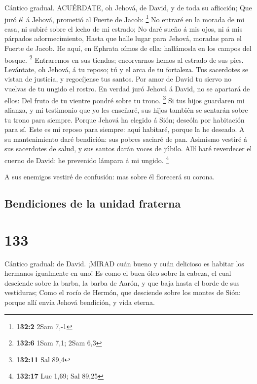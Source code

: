  Cántico gradual. ACUÉRDATE, oh Jehová, de David, y de toda
su aflicción;  Que juró él á Jehová, prometió al Fuerte de
Jacob: \footnote{\textbf{132:2} 2Sam 7,-1}  No entraré en la
morada de mi casa, ni subiré sobre el lecho de mi estrado; 
No daré sueño á mis ojos, ni á mis párpados adormecimiento, 
Hasta que halle lugar para Jehová, moradas para el Fuerte de Jacob.
 He aquí, en Ephrata oímos de ella: hallámosla en los campos
del bosque. \footnote{\textbf{132:6} 1Sam 7,1; 2Sam 6,3} 
Entraremos en sus tiendas; encorvarnos hemos al estrado de sus pies.
 Levántate, oh Jehová, á tu reposo; tú y el arca de tu
fortaleza.  Tus sacerdotes se vistan de justicia, y
regocíjense tus santos.  Por amor de David tu siervo no
vuelvas de tu ungido el rostro.  En verdad juró Jehová á
David, no se apartará de ellos: Del fruto de tu vientre pondré sobre tu
trono. \footnote{\textbf{132:11} Sal 89,4}  Si tus hijos
guardaren mi alianza, y mi testimonio que yo les enseñaré, sus hijos
también se sentarán sobre tu trono para siempre.  Porque
Jehová ha elegido á Sión; deseóla por habitación para sí. 
Este es mi reposo para siempre: aquí habitaré, porque la he deseado.
 A su mantenimiento daré bendición: sus pobres saciaré de
pan.  Asimismo vestiré á sus sacerdotes de salud, y sus
santos darán voces de júbilo.  Allí haré reverdecer el
cuerno de David: he prevenido lámpara á mi ungido. \footnote{\textbf{132:17}
  Luc 1,69; Sal 89,25}

 A sus enemigos vestiré de confusión: mas sobre él
florecerá su corona.

\hypertarget{bendiciones-de-la-unidad-fraterna}{%
\subsection{Bendiciones de la unidad
fraterna}\label{bendiciones-de-la-unidad-fraterna}}

\hypertarget{section-132}{%
\section{133}\label{section-132}}

 Cántico gradual: de David. ¡MIRAD cuán bueno y cuán
delicioso es habitar los hermanos igualmente en uno!  Es
como el buen óleo sobre la cabeza, el cual desciende sobre la barba, la
barba de Aarón, y que baja hasta el borde de sus vestiduras;
 Como el rocío de Hermón, que desciende sobre los montes de
Sión: porque allí envía Jehová bendición, y vida eterna.

